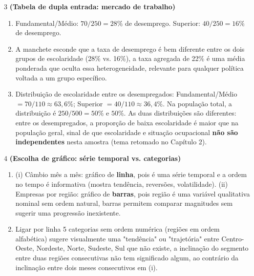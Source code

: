 \documentclass[11pt]{article}
\begin{document}
\begin{questao}{3} \textbf{(Tabela de dupla entrada: mercado de trabalho)}
\begin{solucao}
\begin{enumerate}[label=(\alph*)]
  \item Fundamental/Médio: $70/250 = 28\%$ de desemprego. Superior: $40/250 = 16\%$ de desemprego.
  \item A manchete esconde que a taxa de desemprego é bem diferente entre os dois grupos de
    escolaridade (28\% vs. 16\%), a taxa agregada de 22\% é uma média ponderada que oculta essa
    heterogeneidade, relevante para qualquer política voltada a um grupo específico.
  \item Distribuição de escolaridade entre os desempregados: Fundamental/Médio $=70/110\approx
    63{,}6\%$; Superior $=40/110\approx 36{,}4\%$. Na população total, a distribuição é
    $250/500=50\%$ e $50\%$. As duas distribuições são diferentes: entre os desempregados, a
    proporção de baixa escolaridade é maior que na população geral, sinal de que escolaridade e
    situação ocupacional \textbf{não são independentes} nesta amostra (tema retomado no Capítulo 2).
\end{enumerate}
\end{solucao}
\end{questao}

\begin{questao}{4} \textbf{(Escolha de gráfico: série temporal vs. categorias)}
\begin{solucao}
\begin{enumerate}[label=(\alph*)]
  \item (i) Câmbio mês a mês: gráfico de \textbf{linha}, pois é uma série temporal e a ordem no tempo
    é informativa (mostra tendência, reversões, volatilidade). (ii) Empresas por região: gráfico
    de \textbf{barras}, pois região é uma variável qualitativa nominal sem ordem natural, barras
    permitem comparar magnitudes sem sugerir uma progressão inexistente.
  \item Ligar por linha 5 categorias sem ordem numérica (regiões em ordem alfabética) sugere
    visualmente uma "tendência" ou "trajetória" entre Centro-Oeste, Nordeste, Norte, Sudeste, Sul
    que não existe, a inclinação do segmento entre duas regiões consecutivas não tem
    significado algum, ao contrário da inclinação entre dois meses consecutivos em (i).
\end{enumerate}
\end{solucao}
\end{questao}
\end{document}

